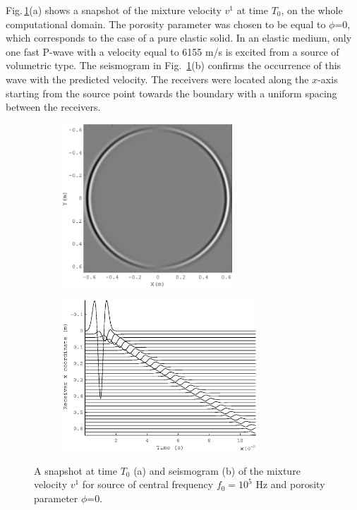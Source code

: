 \documentclass[3p,times,table]{article}
\begin{document}
Fig.\,\ref{fig:porosity 0}(a) shows a snapshot of the mixture velocity $v^1$  
at time $T_{0}$, on the whole computational domain. The porosity parameter was 
chosen to be equal to $\phi$=0, which corresponds to the case of a pure elastic solid. 
In an elastic medium, only one fast P-wave with a velocity  equal to 6155 m/s 
is 
excited from a source of volumetric type. The seismogram in Fig.\,
\ref{fig:porosity 0}(b) confirms the occurrence of this wave with the predicted 
velocity. The receivers were located along the $ x $-axis starting from 
the source point towards the boundary with a uniform 
spacing between the receivers.
\begin{figure}[!htbp]
\begin{subfigure}{0.5\linewidth}
\includegraphics[draft=false,width=0.7\textwidth]{Figures/wave_alfa_s_1}
\caption{}
\end{subfigure}
\hfill
\begin{subfigure}{0.5\linewidth}
\includegraphics[draft=false,width=0.8\textwidth]{Figures/alfa_s_1}
\caption{}
\end{subfigure}%
\caption{A snapshot at time $T_{0}$ (a) and seismogram (b) of the mixture 
velocity $v^1$  for source of central frequency $f_{0} =10^{5} $ Hz and 
porosity 
parameter $\phi$=0.}
\label{fig:porosity 0}
\end{figure}
\end{document}
